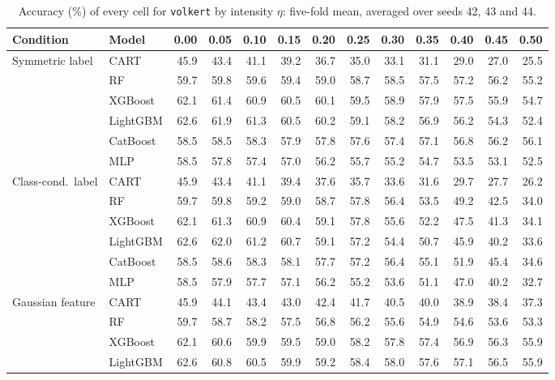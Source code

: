 \documentclass[pdflatex,sn-mathphys]{sn-jnl}
\theoremstyle{thmstyleone}
\begin{document}
\begin{table}[htbp]
\centering
\tiny
\setlength{\tabcolsep}{2.6pt}
\caption{Accuracy (\%) of every cell for \texttt{volkert} by intensity $\eta$: five-fold mean, averaged over seeds 42, 43 and 44.}
\label{tab:grid_volkert}
\begin{tabular}{@{}llrrrrrrrrrrr@{}}
\toprule
Condition & Model & 0.00 & 0.05 & 0.10 & 0.15 & 0.20 & 0.25 & 0.30 & 0.35 & 0.40 & 0.45 & 0.50 \\
\midrule
Symmetric label & CART & 45.9 & 43.4 & 41.1 & 39.2 & 36.7 & 35.0 & 33.1 & 31.1 & 29.0 & 27.0 & 25.5 \\
 & RF & 59.7 & 59.8 & 59.6 & 59.4 & 59.0 & 58.7 & 58.5 & 57.5 & 57.2 & 56.2 & 55.2 \\
 & XGBoost & 62.1 & 61.4 & 60.9 & 60.5 & 60.1 & 59.5 & 58.9 & 57.9 & 57.5 & 55.9 & 54.7 \\
 & LightGBM & 62.6 & 61.9 & 61.3 & 60.5 & 60.2 & 59.1 & 58.2 & 56.9 & 56.2 & 54.3 & 52.4 \\
 & CatBoost & 58.5 & 58.5 & 58.3 & 57.9 & 57.8 & 57.6 & 57.4 & 57.1 & 56.8 & 56.2 & 56.1 \\
 & MLP & 58.5 & 57.8 & 57.4 & 57.0 & 56.2 & 55.7 & 55.2 & 54.7 & 53.5 & 53.1 & 52.5 \\
\midrule
Class-cond.\ label & CART & 45.9 & 43.4 & 41.1 & 39.4 & 37.6 & 35.7 & 33.6 & 31.6 & 29.7 & 27.7 & 26.2 \\
 & RF & 59.7 & 59.8 & 59.2 & 59.0 & 58.7 & 57.8 & 56.4 & 53.5 & 49.2 & 42.5 & 34.0 \\
 & XGBoost & 62.1 & 61.3 & 60.9 & 60.4 & 59.1 & 57.8 & 55.6 & 52.2 & 47.5 & 41.3 & 34.1 \\
 & LightGBM & 62.6 & 62.0 & 61.2 & 60.7 & 59.1 & 57.2 & 54.4 & 50.7 & 45.9 & 40.2 & 33.6 \\
 & CatBoost & 58.5 & 58.6 & 58.3 & 58.1 & 57.7 & 57.2 & 56.4 & 55.1 & 51.9 & 45.4 & 34.6 \\
 & MLP & 58.5 & 57.9 & 57.7 & 57.1 & 56.2 & 55.2 & 53.6 & 51.1 & 47.0 & 40.2 & 32.7 \\
\midrule
Gaussian feature & CART & 45.9 & 44.1 & 43.4 & 43.0 & 42.4 & 41.7 & 40.5 & 40.0 & 38.9 & 38.4 & 37.3 \\
 & RF & 59.7 & 58.7 & 58.2 & 57.5 & 56.8 & 56.2 & 55.6 & 54.9 & 54.6 & 53.6 & 53.3 \\
 & XGBoost & 62.1 & 60.6 & 59.9 & 59.5 & 59.0 & 58.2 & 57.8 & 57.4 & 56.9 & 56.3 & 55.9 \\
 & LightGBM & 62.6 & 60.8 & 60.5 & 59.9 & 59.2 & 58.4 & 58.0 & 57.6 & 57.1 & 56.5 & 55.9 \\

\end{tabular}
\end{table}
\end{document}
